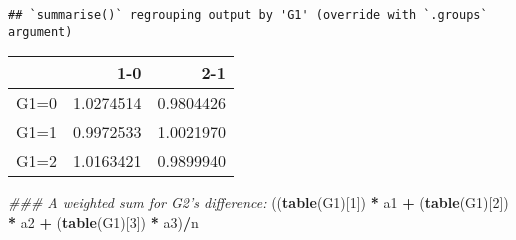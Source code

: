 \documentclass[]{article}
\newenvironment{Shaded}{\begin{snugshade}}{\end{snugshade}}
\newcommand{\CommentTok}[1]{\textcolor[rgb]{0.56,0.35,0.01}{\textit{#1}}}
\newcommand{\DataTypeTok}[1]{\textcolor[rgb]{0.13,0.29,0.53}{#1}}
\newcommand{\DecValTok}[1]{\textcolor[rgb]{0.00,0.00,0.81}{#1}}
\newcommand{\KeywordTok}[1]{\textcolor[rgb]{0.13,0.29,0.53}{\textbf{#1}}}
\newcommand{\NormalTok}[1]{#1}
\newcommand{\OperatorTok}[1]{\textcolor[rgb]{0.81,0.36,0.00}{\textbf{#1}}}
\newcommand{\StringTok}[1]{\textcolor[rgb]{0.31,0.60,0.02}{#1}}
\begin{document}
\begin{Shaded}
\end{Shaded}

\begin{verbatim}
## `summarise()` regrouping output by 'G1' (override with `.groups` argument)
\end{verbatim}

\begin{Shaded}
\end{Shaded}

\begin{longtable}[]{@{}lrr@{}}
\toprule
& 1-0 & 2-1\tabularnewline
\midrule
\endhead
G1=0 & 1.0274514 & 0.9804426\tabularnewline
G1=1 & 0.9972533 & 1.0021970\tabularnewline
G1=2 & 1.0163421 & 0.9899940\tabularnewline
\bottomrule
\end{longtable}

\begin{Shaded}
\begin{Highlighting}[]
\CommentTok{### A weighted sum for G2's difference:}
\NormalTok{((}\KeywordTok{table}\NormalTok{(G1)[}\DecValTok{1}\NormalTok{]) }\OperatorTok{*}\StringTok{ }\NormalTok{a1 }\OperatorTok{+}\StringTok{ }\NormalTok{(}\KeywordTok{table}\NormalTok{(G1)[}\DecValTok{2}\NormalTok{]) }\OperatorTok{*}\StringTok{ }\NormalTok{a2 }\OperatorTok{+}\StringTok{ }\NormalTok{(}\KeywordTok{table}\NormalTok{(G1)[}\DecValTok{3}\NormalTok{]) }\OperatorTok{*}\StringTok{ }\NormalTok{a3)}\OperatorTok{/}\NormalTok{n}
\end{Highlighting}
\end{Shaded}
\end{document}
